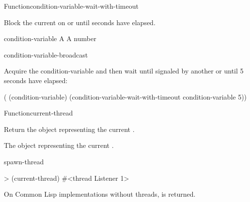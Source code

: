 \begin{functiondoc}{Function}{condition-variable-wait-with-timeout}%
  {}
%

\fnsyntax

\fnpurpose Block the current  on  or until
 seconds have elapsed.

\fnpackage {}

\fnmodule {}

\fnargs
\begin{args}{condition-variable}
 A 
\arg[seconds] A number
\end{args}

\fnerrors
\nocvlock{}
\par
\nothreads{}

\begin{alsos}{condition-variable-broadcast}
\end{alsos}

%
\fnexample Acquire the condition-variable  and then wait until
signaled by another  or until 5 seconds have elapsed:
\begin{example}
  ( (condition-variable)
    (condition-variable-wait-with-timeout condition-variable 5))
\end{example}

\end{functiondoc}


\begin{functiondoc}{Function}{current-thread}{\noargs{} 
    \returns{} }
%

\fnsyntax

\fnpurpose Return the object representing the current .

\fnpackage {}

\fnmodule {}

\fnreturns The object representing the current . 

\begin{alsos}{spawn-thread}
\end{alsos}

\fnexample
\begin{example}
> (current-thread)
#<thread Listener 1>
\end{example}

\fnnote On Common Lisp implementations without threads, \nil{} is returned.

\end{functiondoc}

